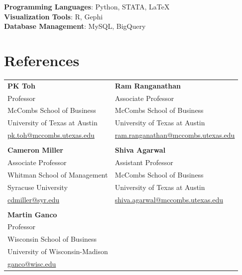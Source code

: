 \documentclass[a4paper,11pt]{article}
\begin{document}
\textbf{Programming Languages}{: Python, STATA, \LaTeX}
\\
\textbf{Visualization Tools}{: R, Gephi}
\\
\textbf{Database Management}{: MySQL, BigQuery}

\section{References}
\begin{tabular*}{\textwidth}{@{\extracolsep{\fill}} l l}
    \textbf{PK Toh} & \textbf{Ram Ranganathan} \\
    Professor & Associate Professor \\
    McCombs School of Business & McCombs School of Business \\
    University of Texas at Austin & University of Texas at Austin \\
    \href{mailto:pk.toh@mccombs.utexas.edu}{pk.toh@mccombs.utexas.edu} & \href{mailto:ram.ranganathan@mccombs.utexas.edu}{ram.ranganathan@mccombs.utexas.edu} \\
    \\
    \textbf{Cameron Miller} & \textbf{Shiva Agarwal} \\
    Associate Professor & Assistant Professor \\
    Whitman School of Management & McCombs School of Business \\
    Syracuse University & University of Texas at Austin \\
    \href{mailto:cdmiller@syr.edu}{cdmiller@syr.edu} & 
    \href{mailto:shiva.agarwal@mccombs.utexas.edu}{shiva.agarwal@mccombs.utexas.edu} \\
    \\
    \textbf{Martin Ganco} \\
    Professor \\
    Wisconsin School of Business \\
    University of Wisconsin-Madison \\
    \href{mailto:ganco@wisc.edu}{ganco@wisc.edu}
\end{tabular*}

\end{document}
